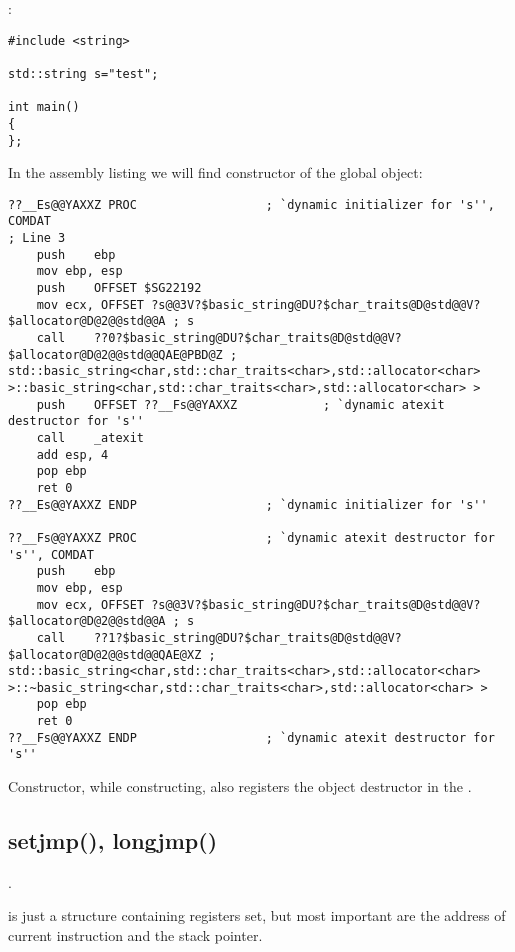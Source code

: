 :

\begin{lstlisting}
#include <string>

std::string s="test";

int main()
{
};
\end{lstlisting}

{In the assembly listing we will find constructor of the global object}:

\begin{lstlisting}[caption=MSVC 2010]
??__Es@@YAXXZ PROC					; `dynamic initializer for 's'', COMDAT
; Line 3
	push	ebp
	mov	ebp, esp
	push	OFFSET $SG22192
	mov	ecx, OFFSET ?s@@3V?$basic_string@DU?$char_traits@D@std@@V?$allocator@D@2@@std@@A ; s
	call	??0?$basic_string@DU?$char_traits@D@std@@V?$allocator@D@2@@std@@QAE@PBD@Z ; std::basic_string<char,std::char_traits<char>,std::allocator<char> >::basic_string<char,std::char_traits<char>,std::allocator<char> >
	push	OFFSET ??__Fs@@YAXXZ			; `dynamic atexit destructor for 's''
	call	_atexit
	add	esp, 4
	pop	ebp
	ret	0
??__Es@@YAXXZ ENDP					; `dynamic initializer for 's''

??__Fs@@YAXXZ PROC					; `dynamic atexit destructor for 's'', COMDAT
	push	ebp
	mov	ebp, esp
	mov	ecx, OFFSET ?s@@3V?$basic_string@DU?$char_traits@D@std@@V?$allocator@D@2@@std@@A ; s
	call	??1?$basic_string@DU?$char_traits@D@std@@V?$allocator@D@2@@std@@QAE@XZ ; std::basic_string<char,std::char_traits<char>,std::allocator<char> >::~basic_string<char,std::char_traits<char>,std::allocator<char> >
	pop	ebp
	ret	0
??__Fs@@YAXXZ ENDP					; `dynamic atexit destructor for 's''
\end{lstlisting}

{Constructor, while constructing, also registers the object destructor in the} .



\subsection{setjmp(), longjmp()}

.

 
{is just a structure containing registers set, but most important are the address of current instruction
and the stack pointer}.

